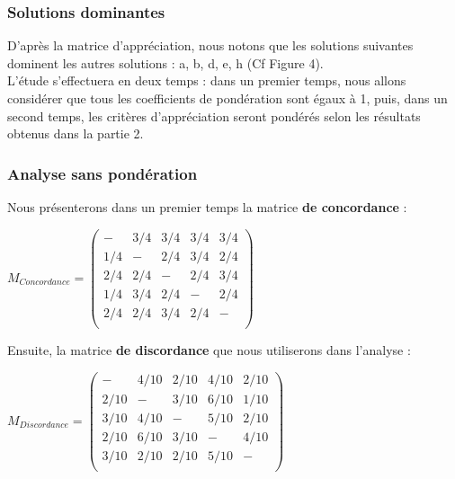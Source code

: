 \documentclass[a4paper, 11pt]{article}
\begin{document}
\subsubsection{Solutions dominantes}
D’après la matrice d'appréciation, nous notons que les solutions suivantes dominent les autres solutions : a, b, d, e, h (Cf Figure 4).\\

L’étude s'effectuera en deux temps : dans un premier temps, nous allons considérer que tous les coefficients de pondération sont égaux à 1, puis, dans un second temps, les critères d’appréciation seront pondérés selon les résultats obtenus dans la partie 2.
\subsubsection{Analyse sans pondération}
Nous présenterons dans un premier temps la matrice \textbf{de concordance} :
\begin{center}
$ M_{Concordance} =\begin{pmatrix}
-&3/4&3/4&3/4&3/4\\
1/4&-&2/4&3/4&2/4\\
2/4&2/4&-&2/4&3/4\\
1/4&3/4&2/4&-&2/4\\
2/4&2/4&3/4&2/4&-\\
\end{pmatrix} $\\
\end{center}
Ensuite, la matrice \textbf{de discordance} que nous utiliserons dans l'analyse :
\begin{center}
$ M_{Discordance} =\begin{pmatrix}
-&4/10&2/10&4/10&2/10\\
2/10&-&3/10&6/10&1/10\\
3/10&4/10&-&5/10&2/10\\
2/10&6/10&3/10&-&4/10\\
3/10&2/10&2/10&5/10&-\\
\end{pmatrix} $\\
\end{center}
\end{document}
